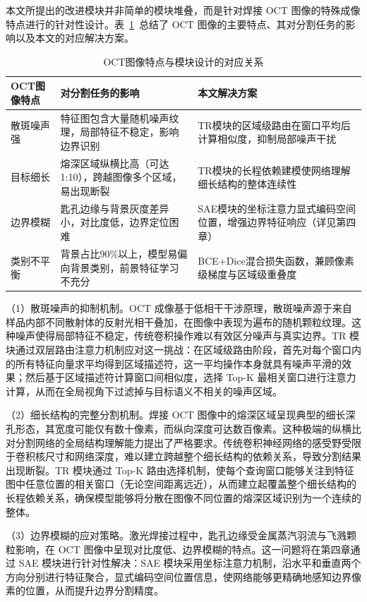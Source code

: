 本文所提出的改进模块并非简单的模块堆叠，而是针对焊接 OCT 图像的特殊成像特点进行的针对性设计。表~\ref{tab:oct_module_relation}~总结了 OCT 图像的主要特点、其对分割任务的影响以及本文的对应解决方案。

\begin{table}[htbp]
\centering
\caption{OCT图像特点与模块设计的对应关系}
\label{tab:oct_module_relation}
\begin{tabular}{p{2.5cm}p{4.5cm}p{4.5cm}}
\toprule
\textbf{OCT图像特点} & \textbf{对分割任务的影响} & \textbf{本文解决方案} \\
\midrule
散斑噪声强 & 特征图包含大量随机噪声纹理，局部特征不稳定，影响边界识别 & TR模块的区域级路由在窗口平均后计算相似度，抑制局部噪声干扰 \\
\midrule
目标细长 & 熔深区域纵横比高（可达1:10），跨越图像多个区域，易出现断裂 & TR模块的长程依赖建模使网络理解细长结构的整体连续性 \\
\midrule
边界模糊 & 匙孔边缘与背景灰度差异小，对比度低，边界定位困难 & SAE模块的坐标注意力显式编码空间位置，增强边界特征响应（详见第四章） \\
\midrule
类别不平衡 & 背景占比90\%以上，模型易偏向背景类别，前景特征学习不充分 & BCE+Dice混合损失函数，兼顾像素级梯度与区域级重叠度 \\
\bottomrule
\end{tabular}
\end{table}

（1）散斑噪声的抑制机制。OCT 成像基于低相干干涉原理，散斑噪声源于来自样品内部不同散射体的反射光相干叠加，在图像中表现为遍布的随机颗粒纹理。这种噪声使得局部特征不稳定，传统卷积操作难以有效区分噪声与真实边界。TR 模块通过双层路由注意力机制应对这一挑战：在区域级路由阶段，首先对每个窗口内的所有特征向量求平均得到区域描述符，这一平均操作本身就具有噪声平滑的效果；然后基于区域描述符计算窗口间相似度，选择 Top-K 最相关窗口进行注意力计算，从而在全局视角下过滤掉与目标语义不相关的噪声区域。

（2）细长结构的完整分割机制。焊接 OCT 图像中的熔深区域呈现典型的细长深孔形态，其宽度可能仅有数十像素，而纵向深度可达数百像素。这种极端的纵横比对分割网络的全局结构理解能力提出了严格要求。传统卷积神经网络的感受野受限于卷积核尺寸和网络深度，难以建立跨越整个细长结构的依赖关系，导致分割结果出现断裂。TR 模块通过 Top-K 路由选择机制，使每个查询窗口能够关注到特征图中任意位置的相关窗口（无论空间距离远近），从而建立起覆盖整个细长结构的长程依赖关系，确保模型能够将分散在图像不同位置的熔深区域识别为一个连续的整体。

（3）边界模糊的应对策略。激光焊接过程中，匙孔边缘受金属蒸汽羽流与飞溅颗粒影响，在 OCT 图像中呈现对比度低、边界模糊的特点。这一问题将在第四章通过 SAE 模块进行针对性解决：SAE 模块采用坐标注意力机制，沿水平和垂直两个方向分别进行特征聚合，显式编码空间位置信息，使网络能够更精确地感知边界像素的位置，从而提升边界分割精度。


